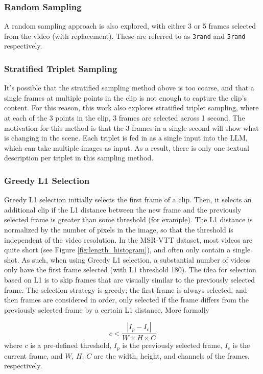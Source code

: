 \subsubsection{Random Sampling}
A random sampling approach is also explored, with either 3 or 5 frames selected from the video (with replacement).
These are referred to as \verb|3rand| and \verb|5rand| respectively.

\subsubsection{Stratified Triplet Sampling}
It's possible that the stratified sampling method above is too coarse, and that a single frames at multiple points in the clip is not enough to capture the clip's content.
For this reason, this work also explores stratified triplet sampling, where at each of the 3 points in the clip, 3 frames are selected across 1 second.
The motivation for this method is that the 3 frames in a single second will show what is changing in the scene.
Each triplet is fed in as a single input into the LLM, which can take multiple images as input.
As a result, there is only one textual description per triplet in this sampling method.

\subsubsection{Greedy L1 Selection}
Greedy L1 selection initially selects the first frame of a clip. Then, it selects an additional clip if the L1 distance between the new frame and the previously selected frame is greater than some threshold (for example).
The L1 distance is normalized by the number of pixels in the image, so that the threshold is independent of the video resolution.
In the MSR-VTT dataset, most videos are quite short (see Figure \ref{fig:length_histogram}), and often only contain a single shot.
As such, when using Greedy L1 selection, a substantial number of videos only have the first frame selected (with L1 threshold 180).
The idea for selection based on L1 is to skip frames that are visually similar to the previously selected frame.
The selection strategy is greedy; the first frame is always selected, and then frames are considered in order, only selected if the frame differs from the previously selected frame by a certain L1 distance.
More formally

\begin{equation}
      c < \frac{|I_{p} - I_{c}|}{W \times H \times C}
\end{equation}
where $c$ is a pre-defined threshold, $I_{p}$ is the previously selected frame, $I_{c}$ is the current frame, and $W$, $H$, $C$ are the width, height, and channels of the frames, respectively.

